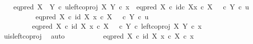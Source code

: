 \begin{isabellebody}
\ \ \isamarkupfalse%
\ {\isachardoublequoteopen}eq{\isacharunderscore}{\kern0pt}pred\ {\isacharparenleft}{\kern0pt}X\ {\isasymCoprod}\ Y{\isacharparenright}{\kern0pt}\ {\isasymcirc}\isactrlsub c\ {\isasymlangle}u{\isacharcomma}{\kern0pt}left{\isacharunderscore}{\kern0pt}coproj\ X\ Y\ {\isasymcirc}\isactrlsub c\ x{\isasymrangle}\ {\isacharequal}{\kern0pt}\ {\isacharparenleft}{\kern0pt}eq{\isacharunderscore}{\kern0pt}pred\ X\ {\isasymcirc}\isactrlsub c\ {\isasymlangle}id\isactrlsub c\ X{\isacharcomma}{\kern0pt}x\ {\isasymcirc}\isactrlsub c\ {\isasymbeta}\isactrlbsub X\isactrlesub {\isasymrangle}{\isacharparenright}{\kern0pt}\ {\isasymamalg}\ {\isacharparenleft}{\kern0pt}{\isasymf}\ {\isasymcirc}\isactrlsub c\ {\isasymbeta}\isactrlbsub Y\isactrlesub {\isacharparenright}{\kern0pt}\ {\isasymcirc}\isactrlsub c\ u{\isachardoublequoteclose}\isanewline
\ \ \isamarkupfalse%
\ {\isacharminus}{\kern0pt}\isanewline
\ \ \ \ \isamarkupfalse%
\ {\isachardoublequoteopen}{\isacharparenleft}{\kern0pt}{\isacharparenleft}{\kern0pt}eq{\isacharunderscore}{\kern0pt}pred\ X\ {\isasymcirc}\isactrlsub c\ {\isasymlangle}id\ X{\isacharcomma}{\kern0pt}\ x\ {\isasymcirc}\isactrlsub c\ {\isasymbeta}\isactrlbsub X\isactrlesub {\isasymrangle}{\isacharparenright}{\kern0pt}\ {\isasymamalg}\ {\isacharparenleft}{\kern0pt}{\isasymf}\ {\isasymcirc}\isactrlsub c\ {\isasymbeta}\isactrlbsub Y\isactrlesub {\isacharparenright}{\kern0pt}{\isacharparenright}{\kern0pt}\ {\isasymcirc}\isactrlsub c\ u\isanewline
\ \ \ \ \ \ \ \ {\isacharequal}{\kern0pt}\ {\isacharparenleft}{\kern0pt}{\isacharparenleft}{\kern0pt}eq{\isacharunderscore}{\kern0pt}pred\ X\ {\isasymcirc}\isactrlsub c\ {\isasymlangle}id\ X{\isacharcomma}{\kern0pt}\ x\ {\isasymcirc}\isactrlsub c\ {\isasymbeta}\isactrlbsub X\isactrlesub {\isasymrangle}{\isacharparenright}{\kern0pt}\ {\isasymamalg}\ {\isacharparenleft}{\kern0pt}{\isasymf}\ {\isasymcirc}\isactrlsub c\ {\isasymbeta}\isactrlbsub Y\isactrlesub {\isacharparenright}{\kern0pt}{\isacharparenright}{\kern0pt}\ {\isasymcirc}\isactrlsub c\ left{\isacharunderscore}{\kern0pt}coproj\ X\ Y\ {\isasymcirc}\isactrlsub c\ x{\isachardoublequoteclose}\isanewline
\ \ \ \ \ \ \isamarkupfalse%
\ u{\isacharunderscore}{\kern0pt}is{\isacharunderscore}{\kern0pt}left{\isacharunderscore}{\kern0pt}coproj\ \isamarkupfalse%
\ auto\isanewline
\ \ \ \ \isamarkupfalse%
\ \isamarkupfalse%
\ {\isachardoublequoteopen}{\isachardot}{\kern0pt}{\isachardot}{\kern0pt}{\isachardot}{\kern0pt}\ {\isacharequal}{\kern0pt}\ \ {\isacharparenleft}{\kern0pt}eq{\isacharunderscore}{\kern0pt}pred\ X\ {\isasymcirc}\isactrlsub c\ {\isasymlangle}id\ X{\isacharcomma}{\kern0pt}\ x\ {\isasymcirc}\isactrlsub c\ {\isasymbeta}\isactrlbsub X\isactrlesub {\isasymrangle}{\isacharparenright}{\kern0pt}\ {\isasymcirc}\isactrlsub c\ x\ {\isachardoublequoteclose}\isanewline

\end{isabellebody}
